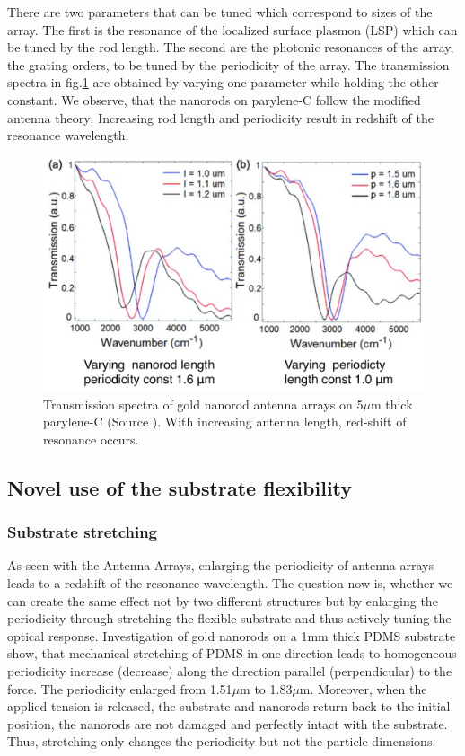 \documentclass[journal, a4paper]{IEEEtran}
\begin{document}
There are two parameters that can be tuned which correspond to sizes of the array. The first is the resonance of the localized surface plasmon (LSP) which can be tuned by the rod length. The second are the photonic resonances of the array, the grating orders, to be tuned by the periodicity of the array. The transmission spectra in fig.\ref{fig:transmission} are obtained by varying one parameter while holding the other constant. We observe, that the nanorods on parylene-C follow the modified antenna theory: Increasing rod length and periodicity result in redshift of the resonance wavelength.

\begin{figure}[hbt!]
\begin{center}
\includegraphics[width=\columnwidth]{12transmission.png}
\caption{Transmission spectra of gold nanorod antenna arrays on 5$\mu$m thick parylene-C (Source \cite{paper}). With increasing antenna length, red-shift of resonance occurs.}
\label{fig:transmission}
\end{center}
\end{figure} 

\subsection{Novel use of the substrate flexibility}
\subsubsection{Substrate stretching}
As seen with the Antenna Arrays, enlarging the periodicity of antenna arrays leads to a redshift of the resonance wavelength. The question now is, whether we can create the same effect not by two different structures but by enlarging the periodicity through stretching the flexible substrate and thus actively tuning the optical response. Investigation of gold nanorods on a 1mm thick PDMS substrate show, that mechanical stretching of PDMS in one direction leads to homogeneous periodicity increase (decrease) along the direction parallel (perpendicular) to the force. The periodicity enlarged from 1.51$\mu$m to 1.83$\mu$m. Moreover, when the applied tension is released, the substrate and nanorods return back to the initial position, the nanorods are not damaged and perfectly intact with the substrate. Thus, stretching only changes the periodicity but not the particle dimensions. 
\end{document}
